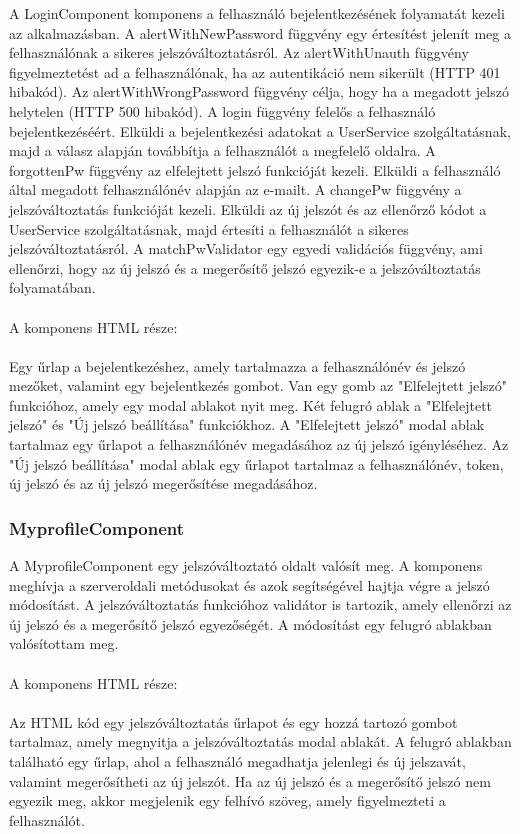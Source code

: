 A LoginComponent komponens a felhasználó bejelentkezésének folyamatát kezeli az  alkalmazásban. A alertWithNewPassword függvény egy értesítést jelenít meg a felhasználónak a sikeres jelszóváltoztatásról. Az alertWithUnauth függvény figyelmeztetést ad a felhasználónak, ha az autentikáció nem sikerült (HTTP 401 hibakód). Az alertWithWrongPassword függvény célja, hogy ha a megadott jelszó helytelen (HTTP 500 hibakód). A login függvény felelős a felhasználó bejelentkezéséért. Elküldi a bejelentkezési adatokat a UserService szolgáltatásnak, majd a válasz alapján továbbítja a felhasználót a megfelelő oldalra. A forgottenPw függvény az elfelejtett jelszó funkcióját kezeli. Elküldi a felhasználó által megadott felhasználónév alapján az e-mailt. A changePw függvény a jelszóváltoztatás funkcióját kezeli. Elküldi az új jelszót és az ellenőrző kódot a UserService szolgáltatásnak, majd értesíti a felhasználót a sikeres jelszóváltoztatásról. A matchPwValidator egy egyedi validációs függvény, ami ellenőrzi, hogy az új jelszó és a megerősítő jelszó egyezik-e a jelszóváltoztatás folyamatában.\\
\\
A komponens HTML része:\\
\\
Egy űrlap a bejelentkezéshez, amely tartalmazza a felhasználónév és jelszó mezőket, valamint egy bejelentkezés gombot. Van egy gomb az "Elfelejtett jelszó" funkcióhoz, amely egy modal ablakot nyit meg. Két felugró ablak a "Elfelejtett jelszó" és "Új jelszó beállítása" funkciókhoz. A "Elfelejtett jelszó" modal ablak tartalmaz egy űrlapot a felhasználónév megadásához az új jelszó igényléséhez. Az "Új jelszó beállítása" modal ablak egy űrlapot tartalmaz a felhasználónév, token, új jelszó és az új jelszó megerősítése megadásához.


\subsubsection{MyprofileComponent}

A MyprofileComponent egy jelszóváltoztató oldalt valósít meg. A komponens meghívja a szerveroldali metódusokat és azok segítségével hajtja végre a jelszó módosítást. A jelszóváltoztatás funkcióhoz validátor is tartozik, amely ellenőrzi az új jelszó és a megerősítő jelszó egyezőségét. A módosítást egy felugró ablakban valósítottam meg.\\
\\
A komponens HTML része:\\
\\
Az HTML kód egy jelszóváltoztatás űrlapot és egy hozzá tartozó gombot tartalmaz, amely megnyitja a jelszóváltoztatás modal ablakát. A felugró ablakban található egy űrlap, ahol a felhasználó megadhatja jelenlegi és új jelszavát, valamint megerősítheti az új jelszót. Ha az új jelszó és a megerősítő jelszó nem egyezik meg, akkor megjelenik egy felhívó szöveg, amely figyelmezteti a felhasználót.


